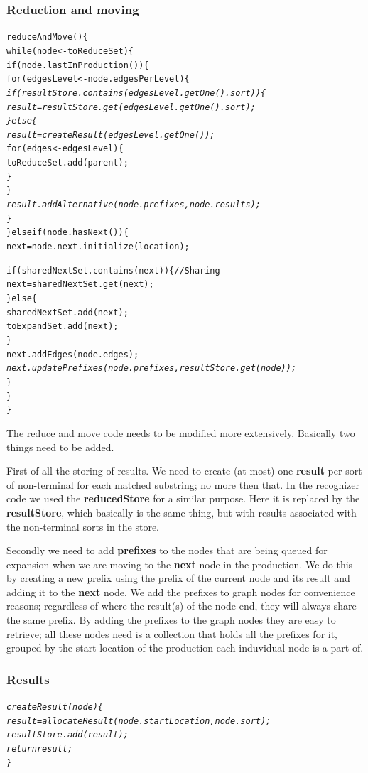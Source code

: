 \documentclass[a4paper,10pt]{article}
\begin{document}
\pagebreak
\subsubsection{Reduction and moving}
{\small
\begin{alltt}
reduceAndMove()\{
  while(node <- toReduceSet)\{
    if(node.lastInProduction())\{
      for(edgesLevel <- node.edgesPerLevel)\{\textit{
        if(resultStore.contains(edgesLevel.getOne().sort))\{
          result = resultStore.get(edgesLevel.getOne().sort);
        \}else\{
          result = createResult(edgesLevel.getOne());}
          for(edges <- edgesLevel)\{
            toReduceSet.add(parent);
          \}
        \}\textit{
        result.addAlternative(node.prefixes, node.results);}
      \}
    \}else if(node.hasNext())\{
      next = node.next.initialize(location);
      
      if(sharedNextSet.contains(next))\{ // Sharing
        next = sharedNextSet.get(next);
      \}else\{
        sharedNextSet.add(next);
        toExpandSet.add(next);
      \}
      next.addEdges(node.edges);\textit{
      next.updatePrefixes(node.prefixes, resultStore.get(node));}
    \}
  \}
\}
\end{alltt}
}

The reduce and move code needs to be modified more extensively. Basically two things need to be added.

First of all the storing of results. We need to create (at most) one {\bf result} per sort of non-terminal for each matched substring; no more then that. In the recognizer code we used the {\bf reducedStore} for a similar purpose. Here it is replaced by the {\bf resultStore}, which basically is the same thing, but with results associated with the non-terminal sorts in the store.

Secondly we need to add {\bf prefixes} to the nodes that are being queued for expansion when we are moving to the {\bf next} node in the production. We do this by creating a new prefix using the prefix of the current node and its result and adding it to the {\bf next} node. We add the prefixes to graph nodes for convenience reasons; regardless of where the result(s) of the node end, they will always share the same prefix. By adding the prefixes to the graph nodes they are easy to retrieve; all these nodes need is a collection that holds all the prefixes for it, grouped by the start location of the production each induvidual node is a part of.

\pagebreak
\subsubsection{Results}
{\small
\begin{alltt}
\textit{createResult(node)\{
  result = allocateResult(node.startLocation, node.sort);
  resultStore.add(result);
  return result;
\}}
\end{alltt}
}
\end{document}
